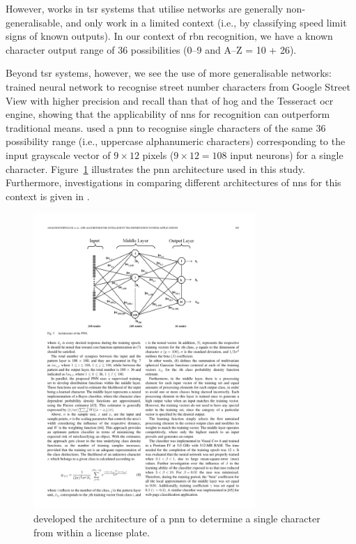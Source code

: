 However, works in \gls{tsr} systems that utilise networks are generally non-generalisable, and only work in a limited context (i.e., by classifying speed limit signs of known outputs). In our context of \gls{rbn} recognition, we have a known character output range of 36 possibilities (0--9 and A--Z = 10 + 26).

Beyond \gls{tsr} systems, however, we see the use of more generalisable networks: \citet{Netzer:2011to} trained neural network to recognise street number characters from Google Street View with higher precision and recall than that of \gls{hog} and the Tesseract \gls{ocr} engine, showing that the applicability of \glspl{nn} for recognition can outperform traditional means. \citet{Anagnostopoulos:2006wv} used a \gls{pnn} to recognise single characters of the same 36 possibility range (i.e., uppercase alphanumeric characters) corresponding to the input grayscale vector of $9 \times 12$ pixels ($9 \times 12 = 108$ input neurons) for a single character. Figure~\ref{fig:background:recognition:anagnostopoulos2006_nn} illustrates the \gls{pnn} architecture used in this study. Furthermore, investigations in comparing different architectures of \glspl{nn} for this context is given in \citet{Lee:2016uy}.

\begin{figure}[h]
  \centering
  \includegraphics[width=0.75\textwidth]{images/background/anagnostopoulos2006_nn}
  \caption[A PNN used to recognise license plate characters]{\citet{Anagnostopoulos:2006wv} developed the architecture of a \gls{pnn} to determine a single character from within a license plate.}
  \label{fig:background:recognition:anagnostopoulos2006_nn}
\end{figure}



